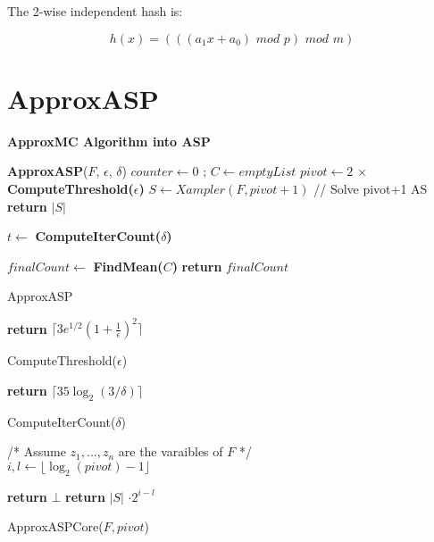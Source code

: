 \documentclass{article}
\begin{document}
The 2-wise independent hash is:

\[ h(x) = (((a_1 x + a_0) \,\, mod \,\, p) \,\, mod \,\, m ) \]

\section{ApproxASP} \label{approxasp}
\textbf{ApproxMC Algorithm into ASP}

\begin{algorithm}[h]
	\textbf{ApproxASP}($F$, $\epsilon$, $\delta$) \;
	\SetAlgoLined
	$counter \gets 0$ ; $C \gets emptyList$\;
	$pivot \gets  2 \, \times $ \textbf{ComputeThreshold($\epsilon$)} \;
	$S \gets Xampler(F, pivot + 1)$ // {Solve pivot+1 AS}  \;
	{ %
		\textbf{return} $|S|$
	} %
	{ %
		$t \gets $ \textbf{ComputeIterCount($\delta$)}

	} %
	$finalCount \gets $ \textbf{FindMean($C$)} \;
	\textbf{return} $finalCount$

	\caption{ApproxASP}
\end{algorithm}


\begin{algorithm}
	\textbf{return} $\lceil 3 e^{1/2} (1 + \frac{1}{\epsilon})^2 \rceil$
	\caption{ComputeThreshold($\epsilon$)}
\end{algorithm}

\begin{algorithm}
	\textbf{return} $\lceil 35 \log_2 (3/\delta) \rceil$
	\caption{ComputeIterCount($\delta$)}
\end{algorithm}

\begin{algorithm}
	/* Assume $z_1 , ..., z_n $ are the varaibles of $F$ */ \\
	$ i, l \gets \lfloor \log_2 (pivot) - 1 \rfloor$ \\
	


	{\textbf{return} $\bot$}
	{\textbf{return} $|S|$ $\cdot 2^{i-l}$}



	\caption{ApproxASPCore($F, pivot$)}
\end{algorithm}
\end{document}
